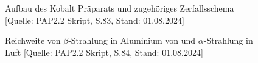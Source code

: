 \documentclass{article}
\begin{document}
\begin{figure}[!p]
    \centering
    \caption{Aufbau des Kobalt Präparats und zugehöriges Zerfallsschema [Quelle: PAP2.2 Skript, S.83, Stand: 01.08.2024]}
    \label{fig:Anhang-Kobalt}
\end{figure}


\begin{figure}[!p]
    \centering
    \caption{Reichweite von $\beta$-Strahlung in Aluminium von und $\alpha$-Strahlung in Luft [Quelle: PAP2.2 Skript, S.84, Stand: 01.08.2024]}
    \label{fig:Anhang-Reichweite}
\end{figure}
\end{document}
